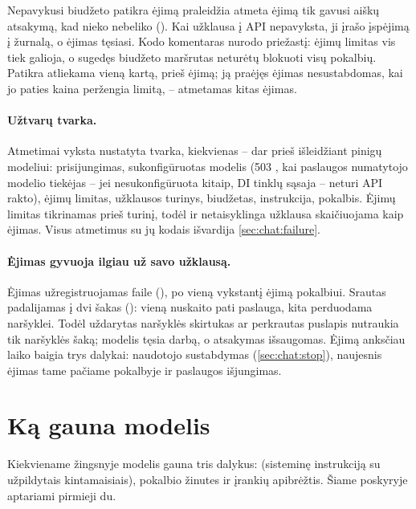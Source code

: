 \begin{codebox}{Nepavykusi biudžeto patikra ėjimą praleidžia}
 atmeta ėjimą tik gavusi aiškų atsakymą, kad nieko nebeliko
(). Kai užklausa į API nepavyksta, ji įrašo įspėjimą į žurnalą, o ėjimas
tęsiasi. Kodo komentaras nurodo priežastį: ėjimų limitas vis tiek galioja, o sugedęs biudžeto
maršrutas neturėtų blokuoti visų pokalbių. Patikra atliekama vieną kartą, prieš ėjimą; ją
praėjęs ėjimas nesustabdomas, kai jo paties kaina peržengia limitą, -- atmetamas kitas ėjimas.
\end{codebox}

\paragraph{Užtvarų tvarka.} Atmetimai vyksta nustatyta tvarka, kiekvienas -- dar prieš
išleidžiant pinigų modeliui: prisijungimas, sukonfigūruotas modelis (503 ,
kai paslaugos numatytojo modelio tiekėjas -- jei nesukonfigūruota kitaip, DI tinklų sąsaja --
neturi API rakto), ėjimų limitas, užklausos turinys, biudžetas, instrukcija, pokalbis. Ėjimų
limitas tikrinamas prieš turinį, todėl ir netaisyklinga užklausa skaičiuojama kaip ėjimas. Visus
atmetimus su jų kodais išvardija \cref{sec:chat:failure}.

\paragraph{Ėjimas gyvuoja ilgiau už savo užklausą.} Ėjimas užregistruojamas faile
 (), po vieną vykstantį ėjimą pokalbiui. Srautas
padalijamas į dvi šakas (): vieną nuskaito pati paslauga, kita perduodama naršyklei.
Todėl uždarytas naršyklės skirtukas ar perkrautas puslapis nutraukia tik naršyklės šaką; modelis
tęsia darbą, o atsakymas išsaugomas. Ėjimą anksčiau laiko baigia trys dalykai: naudotojo
sustabdymas (\cref{sec:chat:stop}), naujesnis ėjimas tame pačiame pokalbyje ir paslaugos
išjungimas.


\section{Ką gauna modelis}\label{sec:chat:given}

Kiekviename žingsnyje modelis gauna tris dalykus:  (sisteminę instrukciją su
užpildytais kintamaisiais), pokalbio žinutes ir įrankių apibrėžtis. Šiame poskyryje aptariami
pirmieji du.

